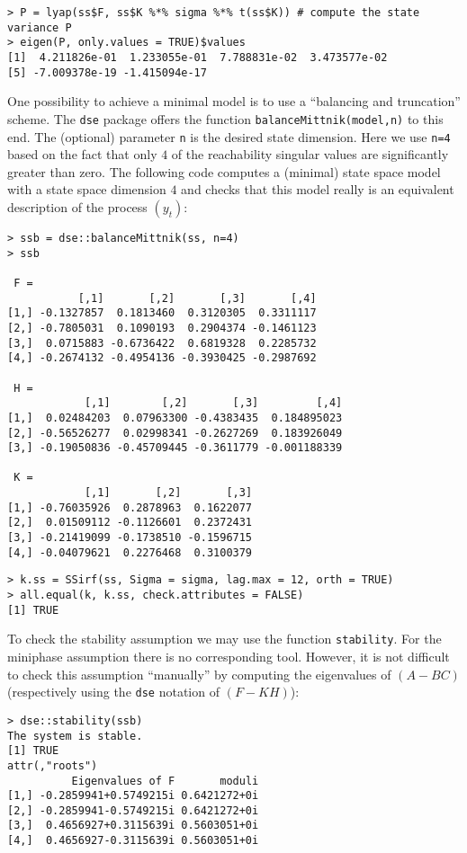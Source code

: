 \documentclass[]{article}
\begin{document}
\begin{verbatim}
> P = lyap(ss$F, ss$K %*% sigma %*% t(ss$K)) # compute the state variance P 
> eigen(P, only.values = TRUE)$values
[1]  4.211826e-01  1.233055e-01  7.788831e-02  3.473577e-02
[5] -7.009378e-19 -1.415094e-17
\end{verbatim}

One possibility to achieve a minimal model is to use a ``balancing and
truncation'' scheme. The \texttt{dse} package offers the function
\texttt{balanceMittnik(model,n)} to this end. The (optional) parameter
\texttt{n} is the desired state dimension. Here we use \texttt{n=4}
based on the fact that only \(4\) of the reachability singular values
are significantly greater than zero. The following code computes a
(minimal) state space model with a state space dimension \(4\) and
checks that this model really is an equivalent description of the
process \((y_t)\):

\begin{verbatim}
> ssb = dse::balanceMittnik(ss, n=4)
> ssb

 F =
           [,1]       [,2]       [,3]       [,4]
[1,] -0.1327857  0.1813460  0.3120305  0.3311117
[2,] -0.7805031  0.1090193  0.2904374 -0.1461123
[3,]  0.0715883 -0.6736422  0.6819328  0.2285732
[4,] -0.2674132 -0.4954136 -0.3930425 -0.2987692

 H =
            [,1]        [,2]       [,3]         [,4]
[1,]  0.02484203  0.07963300 -0.4383435  0.184895023
[2,] -0.56526277  0.02998341 -0.2627269  0.183926049
[3,] -0.19050836 -0.45709445 -0.3611779 -0.001188339

 K =
            [,1]       [,2]       [,3]
[1,] -0.76035926  0.2878963  0.1622077
[2,]  0.01509112 -0.1126601  0.2372431
[3,] -0.21419099 -0.1738510 -0.1596715
[4,] -0.04079621  0.2276468  0.3100379
\end{verbatim}

\begin{verbatim}
> k.ss = SSirf(ss, Sigma = sigma, lag.max = 12, orth = TRUE)
> all.equal(k, k.ss, check.attributes = FALSE)
[1] TRUE
\end{verbatim}

To check the stability assumption we may use the function
\texttt{stability}. For the miniphase assumption there is no
corresponding tool. However, it is not difficult to check this
assumption ``manually'' by computing the eigenvalues of \((A-BC)\)
(respectively using the \texttt{dse} notation of \((F-KH)\)):

\begin{verbatim}
> dse::stability(ssb)
The system is stable.
[1] TRUE
attr(,"roots")
          Eigenvalues of F       moduli
[1,] -0.2859941+0.5749215i 0.6421272+0i
[2,] -0.2859941-0.5749215i 0.6421272+0i
[3,]  0.4656927+0.3115639i 0.5603051+0i
[4,]  0.4656927-0.3115639i 0.5603051+0i
\end{verbatim}
\end{document}
